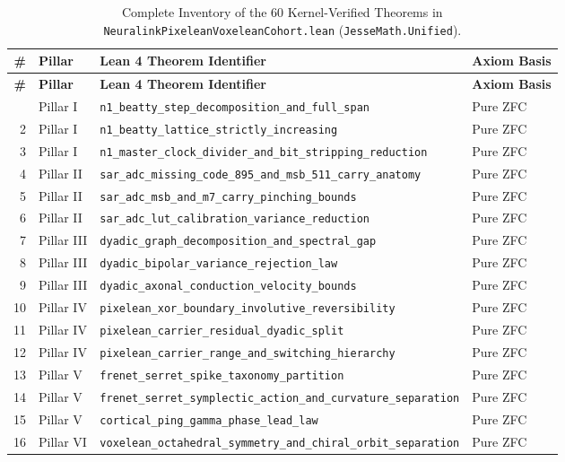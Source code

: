 \documentclass[11pt,letterpaper]{article}
\newcommand{\lean}[1]{\nolinkurl{#1}}
\theoremstyle{definition}
\begin{document}
\begin{footnotesize}
\begin{longtable}{@{}rl>{\raggedright\arraybackslash}p{3.95in}l@{}}
\caption{Complete Inventory of the 60 Kernel-Verified Theorems in \nolinkurl{NeuralinkPixeleanVoxeleanCohort.lean} (\nolinkurl{JesseMath.Unified}).}
\label{tab:theorem_inventory} \\
\toprule
\textbf{\#} & \textbf{Pillar} & \textbf{Lean 4 Theorem Identifier} & \textbf{Axiom Basis} \\
\midrule
\endfirsthead
\toprule
\textbf{\#} & \textbf{Pillar} & \textbf{Lean 4 Theorem Identifier} & \textbf{Axiom Basis} \\
\midrule
\endhead
\bottomrule
\endfoot
1 & Pillar I & \lean{n1_beatty_step_decomposition_and_full_span} & Pure ZFC \\
2 & Pillar I & \lean{n1_beatty_lattice_strictly_increasing} & Pure ZFC \\
3 & Pillar I & \lean{n1_master_clock_divider_and_bit_stripping_reduction} & Pure ZFC \\
4 & Pillar II & \lean{sar_adc_missing_code_895_and_msb_511_carry_anatomy} & Pure ZFC \\
5 & Pillar II & \lean{sar_adc_msb_and_m7_carry_pinching_bounds} & Pure ZFC \\
6 & Pillar II & \lean{sar_adc_lut_calibration_variance_reduction} & Pure ZFC \\
7 & Pillar III & \lean{dyadic_graph_decomposition_and_spectral_gap} & Pure ZFC \\
8 & Pillar III & \lean{dyadic_bipolar_variance_rejection_law} & Pure ZFC \\
9 & Pillar III & \lean{dyadic_axonal_conduction_velocity_bounds} & Pure ZFC \\
10 & Pillar IV & \lean{pixelean_xor_boundary_involutive_reversibility} & Pure ZFC \\
11 & Pillar IV & \lean{pixelean_carrier_residual_dyadic_split} & Pure ZFC \\
12 & Pillar IV & \lean{pixelean_carrier_range_and_switching_hierarchy} & Pure ZFC \\
13 & Pillar V & \lean{frenet_serret_spike_taxonomy_partition} & Pure ZFC \\
14 & Pillar V & \lean{frenet_serret_symplectic_action_and_curvature_separation} & Pure ZFC \\
15 & Pillar V & \lean{cortical_ping_gamma_phase_lead_law} & Pure ZFC \\
16 & Pillar VI & \lean{voxelean_octahedral_symmetry_and_chiral_orbit_separation} & Pure ZFC \\

\end{longtable}
\end{footnotesize}
\end{document}
